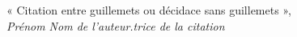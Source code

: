 \thispagestyle{empty}
\vspace*{\fill}
\begin{flushright}
« Citation entre guillemets ou décidace sans guillemets »,\\[1ex]
{\textit{Prénom Nom de l’auteur.trice de la citation}}
\end{flushright}
\vspace*{\fill}
\newpage